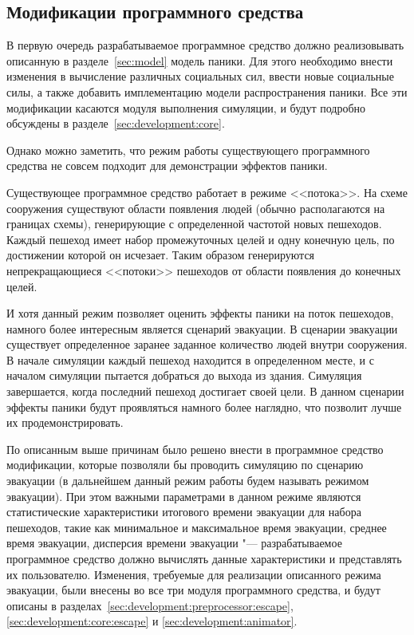 \subsection{Модификации программного средства}
\label{sec:development:common}

В первую очередь разрабатываемое программное средство должно реализовывать описанную в разделе~\ref{sec:model} модель паники.
Для этого необходимо внести изменения в вычисление различных социальных сил, ввести новые социальные силы,
а также добавить имплементацию модели распространения паники.
Все эти модификации касаются модуля выполнения симуляции, и будут подробно обсуждены в разделе~\ref{sec:development:core}.

Однако можно заметить, что режим работы существующего программного средства не совсем подходит для демонстрации эффектов паники.

Существующее программное средство работает в режиме <<потока>>.
На схеме сооружения существуют области появления людей (обычно располагаются на границах схемы),
генерирующие с определенной частотой новых пешеходов.
Каждый пешеход имеет набор промежуточных целей и одну конечную цель, по достижении которой он исчезает.
Таким образом генерируются непрекращающиеся <<потоки>> пешеходов от области появления до конечных целей.

И хотя данный режим позволяет оценить эффекты паники на поток пешеходов, намного более интересным является сценарий эвакуации.
В сценарии эвакуации существует определенное заранее заданное количество людей внутри сооружения.
В начале симуляции каждый пешеход находится в определенном месте, и с началом симуляции пытается добраться до выхода из здания.
Симуляция завершается, когда последний пешеход достигает своей цели.
В данном сценарии эффекты паники будут проявляться намного более наглядно, что позволит лучше их продемонстрировать.

По описанным выше причинам было решено внести в программное средство модификации,
которые позволяли бы проводить симуляцию по сценарию эвакуации
(в дальнейшем данный режим работы будем называть режимом эвакуации).
При этом важными параметрами в данном режиме являются статистические характеристики
итогового времени эвакуации для набора пешеходов, такие как минимальное и максимальное время эвакуации,
среднее время эвакуации, дисперсия времени эвакуации "---
разрабатываемое программное средство должно вычислять данные характеристики и представлять их пользователю.
Изменения, требуемые для реализации описанного режима эвакуации, были внесены во все три модуля программного средства,
и будут описаны в разделах~\ref{sec:development:preprocessor:escape}, \ref{sec:development:core:escape} и \ref{sec:development:animator}.


